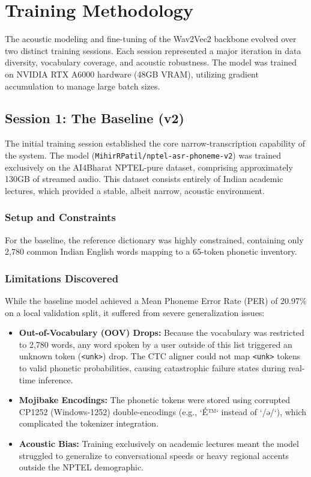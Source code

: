 \chapter{Training Methodology}

The acoustic modeling and fine-tuning of the Wav2Vec2 backbone evolved over two distinct training sessions. Each session represented a major iteration in data diversity, vocabulary coverage, and acoustic robustness. The model was trained on NVIDIA RTX A6000 hardware (48GB VRAM), utilizing gradient accumulation to manage large batch sizes.

\section{Session 1: The Baseline (v2)}
The initial training session established the core narrow-transcription capability of the system. The model (\texttt{MihirRPatil/}\allowbreak\texttt{nptel-asr-phoneme-v2}) was trained exclusively on the AI4Bharat NPTEL-pure dataset, comprising approximately 130GB of streamed audio. This dataset consists entirely of Indian academic lectures, which provided a stable, albeit narrow, acoustic environment.

\subsection{Setup and Constraints}
For the baseline, the reference dictionary was highly constrained, containing only 2,780 common Indian English words mapping to a 65-token phonetic inventory. 

\subsection{Limitations Discovered}
While the baseline model achieved a Mean Phoneme Error Rate (PER) of 20.97\% on a local validation split, it suffered from severe generalization issues:
\begin{itemize}
    \item \textbf{Out-of-Vocabulary (OOV) Drops:} Because the vocabulary was restricted to 2,780 words, any word spoken by a user outside of this list triggered an unknown token (\texttt{<unk>}) drop. The CTC aligner could not map \texttt{<unk>} tokens to valid phonetic probabilities, causing catastrophic failure states during real-time inference.
    \item \textbf{Mojibake Encodings:} The phonetic tokens were stored using corrupted CP1252 (Windows-1252) double-encodings (e.g., `É™` instead of `/ə/`), which complicated the tokenizer integration.
    \item \textbf{Acoustic Bias:} Training exclusively on academic lectures meant the model struggled to generalize to conversational speeds or heavy regional accents outside the NPTEL demographic.
\end{itemize}

